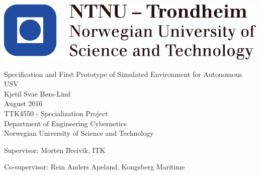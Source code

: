 
\thispagestyle{empty}
\includegraphics[scale=1.1]{fig/NTNU}
\mbox{}\\[6pc]
\begin{center}
\Huge{Specification and First Prototype of Simulated Environment for Autonomous USV}\\[2pc]

\Large{Kjetil Svae Børs-Lind}\\[1pc]
\large{August 2016}\\[2pc]

TTK4550 - Specialization Project\\
Department of Engineering Cybernetics\\
Norwegian University of Science and Technology
\end{center}
\vfill

\noindent Supervisor: Morten Breivik, ITK

\noindent Co-supervisor: Rein Anders Apeland, Kongsberg Maritime


